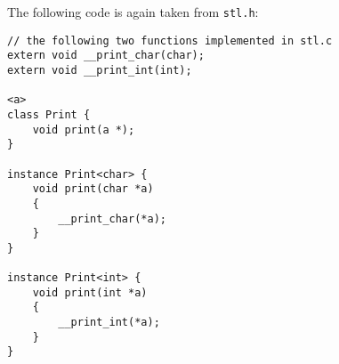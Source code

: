 The following code is again taken from \lstinline[language=sh]{stl.h}:

\begin{lstlisting}
// the following two functions implemented in stl.c
extern void __print_char(char);
extern void __print_int(int);

<a>
class Print {
    void print(a *);
}

instance Print<char> {
    void print(char *a)
    {
        __print_char(*a);
    }
}

instance Print<int> {
    void print(int *a)
    {
        __print_int(*a);
    }
}
\end{lstlisting}
